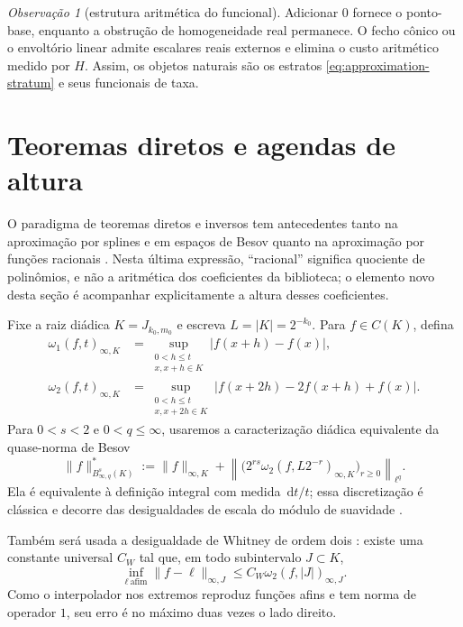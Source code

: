 \documentclass[11pt,a4paper]{article}
\theoremstyle{definition}
\theoremstyle{remark}
\newtheorem{remark}[theorem]{Observação}
\newcommand{\dd}{\,\mathrm{d}}
\begin{document}
\begin{remark}[estrutura aritmética do funcional]
\label{rem:quasinorm-scope}
Adicionar $0$ fornece o ponto-base, enquanto a obstrução de homogeneidade real
permanece. O fecho cônico ou o envoltório linear admite escalares reais
externos e elimina o custo aritmético medido por $H$. Assim, os objetos
naturais são os estratos \eqref{eq:approximation-stratum} e seus funcionais de
taxa.
\end{remark}

\section{Teoremas diretos e agendas de altura}
\label{sec:direct-height}

O paradigma de teoremas diretos e inversos tem antecedentes tanto na
aproximação por splines e em espaços de Besov quanto na aproximação por funções
racionais \citep{petrushev1988,petrushevpopov1987}. Nesta última expressão,
``racional'' significa quociente de polinômios, e não a aritmética dos
coeficientes da biblioteca; o elemento novo desta seção é acompanhar
explicitamente a altura desses coeficientes.

Fixe a raiz diádica $K=J_{k_0,m_0}$ e escreva $L=|K|=2^{-k_0}$. Para
$f\in C(K)$, defina
\begin{align}
 \omega_1(f,t)_{\infty,K}
 &=\sup_{\substack{0<h\le t\\x,x+h\in K}}
   |f(x+h)-f(x)|,\label{eq:first-modulus}\\
 \omega_2(f,t)_{\infty,K}
 &=\sup_{\substack{0<h\le t\\x,x+2h\in K}}
   |f(x+2h)-2f(x+h)+f(x)|.
 \label{eq:second-modulus-direct}
\end{align}
Para $0<s<2$ e $0<q\le\infty$, usaremos a caracterização diádica equivalente da
quase-norma de Besov
\begin{equation}
 \|f\|_{B^s_{\infty,q}(K)}^*
 :=\|f\|_{\infty,K}
 +\left\|\bigl(2^{rs}\omega_2(f,L2^{-r})_{\infty,K}
           \bigr)_{r\ge0}\right\|_{\ell^q}.
 \label{eq:dyadic-besov-norm}
\end{equation}
Ela é equivalente à definição integral com medida $\dd t/t$; essa
discretização é clássica e decorre das desigualdades de escala do módulo de
suavidade \citep{devorelorentz1993,devorepopov1988}.

Também será usada a desigualdade de Whitney de ordem dois
\citep{whitney1957,devore1998}: existe uma
constante universal $C_W$ tal que, em todo subintervalo $J\subset K$,
\begin{equation}
 \inf_{\ell\ \text{afim}}\|f-\ell\|_{\infty,J}
 \le C_W\omega_2(f,|J|)_{\infty,J}.
 \label{eq:whitney-direct}
\end{equation}
Como o interpolador nos extremos reproduz funções afins e tem norma de
operador $1$, seu erro é no máximo duas vezes o lado direito.
\end{document}
